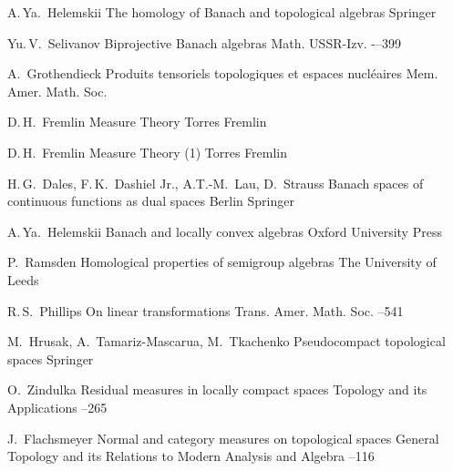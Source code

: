 \documentclass[12pt]{article}
\numberwithin{equation}{subsection}
\theoremstyle{plain}
\begin{document}
\begin{thebibliography}{99}

    \by A.\,Ya.~Helemskii
    \book The homology of Banach and topological algebras
    \publ Springer

    \by Yu.\,V.~Selivanov
    \paper Biprojective Banach algebras
    \jour Math. USSR-Izv.
    -–399

    \by A.~Grothendieck
    \paper Produits tensoriels topologiques et espaces nucl{\'e}aires
    \jour Mem. Amer. Math. Soc.

    \by D.\,H.~Fremlin
    \book Measure Theory
    \publ Torres Fremlin

    \by D.\,H.~Fremlin
    \book Measure Theory
    (1)
    \publ Torres Fremlin

    \by H.\,G.~Dales, F.\,K.~Dashiel Jr., A.T.-M.~Lau, D.~Strauss
    \book Banach spaces of continuous functions as dual spaces
    \publaddr Berlin
    \publ Springer

    \by A.\,Ya.~Helemskii
    \book Banach and locally convex algebras
    \publ Oxford University Press

    \by P.~Ramsden
    \book Homological properties of semigroup algebras
    \publaddr The University of Leeds

    \by R.\,S.~Phillips
    \paper On linear transformations
    \jour Trans. Amer. Math. Soc.
    --541

    \by M.~Hrusak, A.~Tamariz-Mascarua, M.~Tkachenko
    \book Pseudocompact topological spaces
    \publ Springer

    \by O.~Zindulka
    \paper Residual measures in locally compact spaces
    \jour Topology and its Applications
    --265

    \by J.~Flachsmeyer
    \paper Normal and category measures on topological spaces
    \jour General Topology and its Relations to Modern Analysis and Algebra
    --116

\end{thebibliography}
\end{document}
